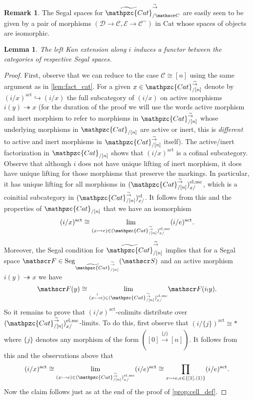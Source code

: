 \documentclass[a4paper, reqno]{amsart}
\newtheorem{lemma}[theorem]{Lemma}
\theoremstyle{definition}
\newtheorem{remark}[theorem]{Remark}
\newcommand\cC{\mathscr C}
\newcommand\cD{\mathscr D}
\newcommand\cE{\mathscr E}
\newcommand\cF{\mathscr F}
\newcommand\cS{\mathscr S}
\newcommand\mc{\mathrm{mc}}
\newcommand\cat{\mathrm{Cat}}
\newcommand\ccat{\mathpzc{Cat}}
\newcommand\wrr{{\overset{\sim}{\rightarrow}}}
\newcommand\act{\mathrm{act}}
\newcommand\el{\mathrm{el}}
\newcommand\seg{\mathrm{Seg}}
\begin{document}
\begin{remark}
The Segal spaces for $\widetilde{\ccat}^\wrr_{/\cC}$ are easily seen to be given by a pair of morphisms $(\cD\rightarrow\cC,\cE\rightarrow\cC^\sim)$ in $\cat$ whose spaces of objects are isomorphic.
\end{remark}
\begin{lemma}\label{lem:free_cat}
The left Kan extension along $i$ induces a functor between the categories of respective Segal spaces.
\end{lemma}
\begin{proof}
First, observe that we can reduce to the case $\cC\cong[n]$ using the same argument as in \cref{lem:fact_cat}. For a given $x\in\ccat^\wrr_{/[n]}$ denote by $(i/x)^\act\hookrightarrow(i/x)$ the full subcategory of $(i/x)$ on active morphisms $i(y)\twoheadrightarrow x$ (for the duration of the proof we will use the words active morphism and inert morphism to refer to morphisms in $\ccat^\wrr_{/[n]}$ whose underlying morphisms in $\ccat_{/[n]}$ are active or inert, this is \textit{different} to active and inert morphisms in $\ccat^\wrr_{/[n]}$ itself). The active/inert factorization in $\ccat_{/[n]}$ shows that $(i/x)^\act$ is a cofinal subcategory. Observe that although $i$ does not have unique lifting of inert morphism, it does have unique lifting for those morphisms that preserve the markings. In particular, it has unique lifting for all morphisms in $(\ccat^\wrr_{/[n]})^{\el,\mc}_{x/}$, which is a coinitial subcategory in $(\ccat^\wrr_{/[n]})^\el_{x/}$. It follows from this and the properties of $\ccat_{/[n]}$ that we have an isomorphism 
\[(i/x)^\act\cong\underset{(x\rightarrowtail e)\in(\ccat^\wrr_{/[n]})^{\el,\mc}_{x/}}{\lim}(i/e)^\act.\]
Moreover, the Segal condition for $\widetilde{\ccat}^\wrr_{/[n]}$ implies that for a Segal space $\cF\in\seg_{\widetilde{\ccat}^\wrr_{/[n]}}(\cS)$ and an active morphism $i(y)\twoheadrightarrow x$ we have \[\cF(y)\cong\underset{(x\overset{i}{\rightarrowtail}e)\in(\ccat^\wrr_{/[n]})^{\el,\mc}_{x/}}{\lim}\cF(i_! y).\]
So it remains to prove that $(i/x)^\act$-colimits distribute over $(\ccat^\wrr_{/[n]})^{\el,\mc}_{x/}$-limits. To do this, first observe that $(i/\{j\})^\act\cong*$ where $\{j\}$ denotes any morphism of the form $([0]\xrightarrow{\{j\}}[n])$. It follows from this and the observations above  that
\[(i/x)^\act\cong\underset{(x\rightarrowtail e)\in(\ccat^\wrr_{/[n]})^{\el,\mc}_{x/}}{\lim}(i/e)^\act\cong\prod_{x\rightarrowtail e,e\in\{[1],\langle1\rangle\}}(i/e)^\act.\]
Now the claim follows just as at the end of the proof of \cref{prop:cell_def}.
\end{proof}
\end{document}
